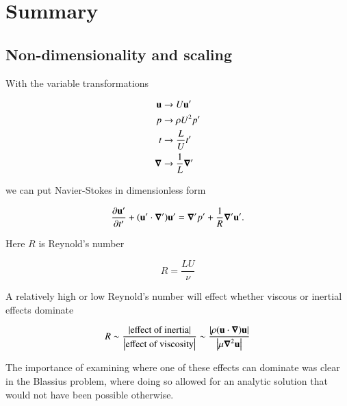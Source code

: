 \section{Summary}
\subsection{Non-dimensionality and scaling}

With the variable transformations

\begin{align}\label{eqn:continuumFluidsReview:2150}
\Bu &\rightarrow U \Bu' \\
p &\rightarrow \rho U^2 p' \\
t &\rightarrow \frac{L}{U} t' \\
\spacegrad &\rightarrow \inv{L} \spacegrad'
\end{align}

we can put Navier-Stokes in dimensionless form

\begin{equation}\label{eqn:continuumFluidsReview:2170}
\PD{t'}{\Bu'} + (\Bu' \cdot \spacegrad') \Bu' = \spacegrad' p' + \inv{R} \spacegrad' \Bu'.
\end{equation}

Here $R$ is Reynold's number

\begin{equation}\label{eqn:continuumFluidsReview:2190}
R = \frac{L U}{\nu}
\end{equation}

A relatively high or low Reynold's number will effect whether viscous or inertial effects dominate

\begin{equation}\label{eqn:continuumFluidsReview:2210}
R 
\sim \frac{\Abs{\text{effect of inertia}}}{\Abs{\text{effect of viscosity}}} 
\sim 
\frac{ \Abs{\rho ( \Bu \cdot \spacegrad ) \Bu } }{\Abs{ \mu \spacegrad^2 \Bu}}
\end{equation}

The importance of examining where one of these effects can dominate was clear in the Blassius problem, where doing so allowed for an analytic solution that would not have been possible otherwise.

